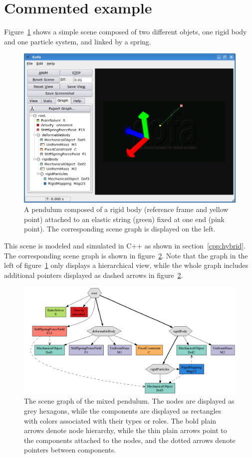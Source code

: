 \section{Commented example} \label{sec:commentedExample}
Figure~\ref{fig:mixedPendulum} shows a simple scene composed of two different objets, one rigid body and one particle system, and linked by a spring.
\begin{figure}
 \centering
 \includegraphics[width=0.9\linewidth]{mixedPendulum.png}
 \caption{A pendulum composed of a rigid body (reference frame and yellow point) attached to an elastic string (green) fixed at one end (pink point). The corresponding scene graph is displayed on the left.}
 \label{fig:mixedPendulum}
\end{figure}
This scene is modeled and simulated in C++ as shown in section~\ref{cpp:hybrid}. The corresponding scene graph is shown in figure~\ref{fig:mixedPendulum-graph}. Note that the graph in the left of figure~\ref{fig:mixedPendulum} only displays a hierarchical view, while the whole graph includes additional pointers displayed as dashed arrows in figure~\ref{fig:mixedPendulum-graph}.
\begin{figure}
 \centering
 \includegraphics[width=\linewidth]{mixedPendulum-graph}
 \caption{The scene graph of the mixed pendulum. The nodes are displayed as grey hexagons, while the components are displayed as rectangles with colors associated with their types or roles. The bold plain arrows denote node hierarchy, while the thin plain arrows point to the components attached to the nodes, and the dotted arrows denote pointers between components.}
 \label{fig:mixedPendulum-graph}
\end{figure}

